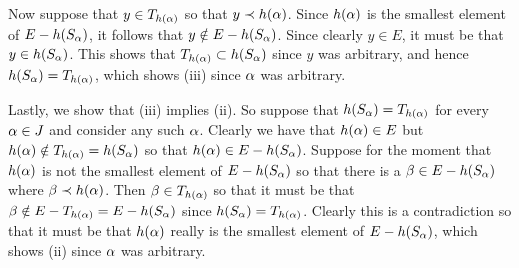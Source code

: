{{    Now suppose that $y \in T_{h(\alpha)}$ so that $y \prec h(\alpha)$.
    Since $h(\alpha)$ is the smallest element of $E - h(S_\alpha)$, it follows that $y \notin E - h(S_\alpha)$.
    Since clearly $y \in E$, it must be that $y \in h(S_\alpha)$.
    This shows that $T_{h(\alpha)} \subset h(S_\alpha)$ since $y$ was arbitrary, and hence $h(S_\alpha) = T_{h(\alpha)}$, which shows (iii) since $\alpha$ was arbitrary.

    Lastly, we show that (iii) implies (ii).
    So suppose that $h(S_\alpha) = T_{h(\alpha)}$ for every $\alpha \in J$ and consider any such $\alpha$.
    Clearly we have that $h(\alpha) \in E$ but $h(\alpha) \notin T_{h(\alpha)} = h(S_\alpha)$ so that $h(\alpha) \in E - h(S_\alpha)$.
    Suppose for the moment that $h(\alpha)$ is not the smallest element of $E - h(S_\alpha)$ so that there is a $\beta \in E - h(S_\alpha)$ where $\beta \prec h(\alpha)$.
    Then $\beta \in T_{h(\alpha)}$ so that it must be that $\beta \notin E - T_{h(\alpha)} = E - h(S_\alpha)$ since $h(S_\alpha) = T_{h(\alpha)}$.
    Clearly this is a contradiction so that it must be that $h(\alpha)$ really is the smallest element of $E - h(S_\alpha)$, which shows (ii) since $\alpha$ was arbitrary.
  }
}

\renewcommand\thesubsection{\arabic{subsection}}
